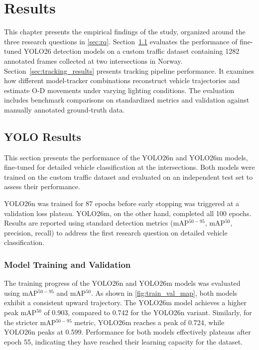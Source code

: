 \chapter{Results}
\label{chap:results}

This chapter presents the empirical findings of the study, organized around the three research questions in \autoref{sec:rq}. Section~\ref{sec:training-results} evaluates the performance of fine-tuned YOLO26 detection models on a custom traffic dataset containing 1282 annotated frames collected at two intersections in Norway. Section~\ref{sec:tracking_results} presents tracking pipeline performance. It examines how different model-tracker combinations reconstruct vehicle trajectories and estimate O-D movements under varying lighting conditions. The evaluation includes benchmark comparisons on standardized metrics and validation against manually annotated ground-truth data.

\section{YOLO Results}
\label{sec:training-results}
This section presents the performance of the YOLO26n and YOLO26m models, fine-tuned for detailed vehicle classification at the intersections. Both models were trained on the custom traffic dataset and evaluated on an independent test set to assess their performance. 

YOLO26n was trained for 87 epochs before early stopping was triggered at a validation loss plateau. YOLO26m, on the other hand, completed all 100 epochs. Results are reported using standard detection metrics (mAP$^{50-95}$, mAP$^{50}$, precision, recall) to address the first research question on detailed vehicle classification.

\subsection{Model Training and Validation}
\label{sec:yolo_train_val}

The training progress of the YOLO26n and YOLO26m models was evaluated using mAP$^{50-95}$ and mAP$^{50}$. As shown in \autoref{fig:train_val_map}, both models exhibit a consistent upward trajectory. The YOLO26m model achieves a higher peak mAP$^{50}$ of 0.903, compared to 0.742 for the YOLO26n variant. Similarly, for the stricter mAP$^{50-95}$ metric, YOLO26m reaches a peak of 0.724, while YOLO26n peaks at 0.599. Performance for both models effectively plateaus after epoch 55, indicating they have reached their learning capacity for the dataset.

